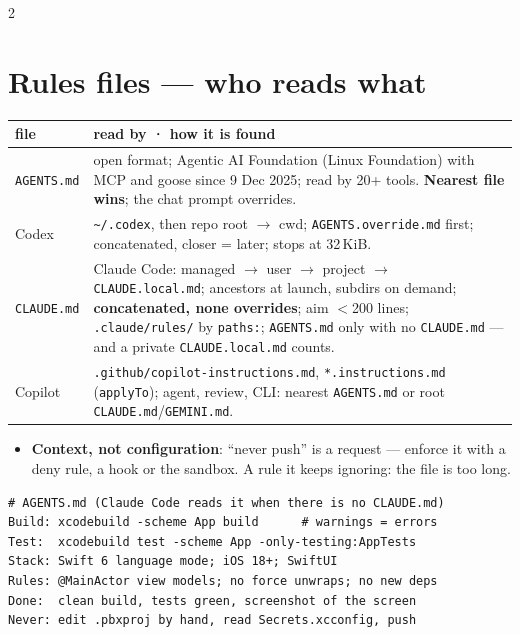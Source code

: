 \documentclass[8pt]{extarticle}
\newcommand\ct[1]{\texttt{#1}}
\newcommand\tld{\textasciitilde}
\begin{document}

\begin{multicols}{2}
\raggedright
\footnotesize{}

\section{Rules files — who reads what}
{\scriptsize\setlength{\tabcolsep}{2pt}
\begin{tabular}{@{}>{\raggedright\arraybackslash}p{13mm}>{\raggedright\arraybackslash}p{65mm}@{}}
\toprule
\textbf{file} & \textbf{read by · how it is found}\\
\midrule
\ct{AGENTS.md} & open format; Agentic AI Foundation (Linux Foundation) with MCP and goose since
  9 Dec 2025; read by 20+ tools. \textbf{Nearest file
  wins}; the chat prompt overrides.\\
Codex & \ct{\tld/.codex}, then repo root $\to$ cwd; \ct{AGENTS.override.md} first; concatenated,
  closer = later; stops at 32\,KiB.\\
\ct{CLAUDE.md} & Claude Code: managed $\to$ user $\to$ project $\to$ \ct{CLAUDE.local.md}; ancestors
  at launch, subdirs on demand; \textbf{concatenated, none overrides}; aim
  $<$200 lines; \ct{.claude/rules/} by \ct{paths:}; \ct{AGENTS.md} only with no \ct{CLAUDE.md} — and a private \ct{CLAUDE.local.md} counts.\\
Copilot & \ct{.github/copilot-instructions.md}, \ct{*.instructions.md} (\ct{applyTo}); agent,
  review, CLI: nearest \ct{AGENTS.md} or root \ct{CLAUDE.md}/\ct{GEMINI.md}.\\
\bottomrule
\end{tabular}}
\begin{itemize}
  \item \textbf{Context, not configuration}: ``never push'' is a request — enforce it with a deny
        rule, a hook or the sandbox. A rule it keeps ignoring: the file is too long.
\end{itemize}
\begin{lstlisting}[language=RulesSheet]
# AGENTS.md (Claude Code reads it when there is no CLAUDE.md)
Build: xcodebuild -scheme App build      # warnings = errors
Test:  xcodebuild test -scheme App -only-testing:AppTests
Stack: Swift 6 language mode; iOS 18+; SwiftUI
Rules: @MainActor view models; no force unwraps; no new deps
Done:  clean build, tests green, screenshot of the screen
Never: edit .pbxproj by hand, read Secrets.xcconfig, push
\end{lstlisting}


\end{multicols}
\end{document}
